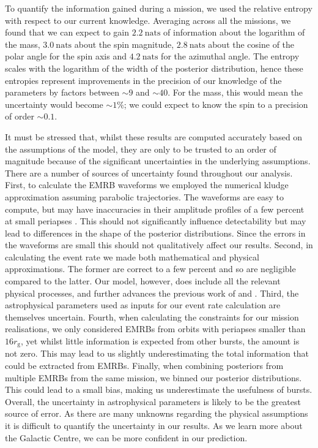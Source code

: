 \documentclass[useAMS,usedcolumn,usegraphicx,usenatbib]{mn2e}
\newcommand{\units}[1]{\ensuremath{~\mathrm{#1}}}
\newcommand{\sub}[1]{\ensuremath{_\mathrm{#1}}}
\begin{document}
To quantify the information gained during a mission, we used the relative entropy with respect to our current knowledge. Averaging across all the missions, we found that we can expect to gain $2.2\units{nats}$ of information about the logarithm of the mass, $3.0\units{nats}$ about the spin magnitude, $2.8\units{nats}$ about the cosine of the polar angle for the spin axis and $4.2\units{nats}$ for the azimuthal angle. The entropy scales with the logarithm of the width of the posterior distribution, hence these entropies represent improvements in the precision of our knowledge of the parameters by factors between $\sim9$ and $\sim40$. For the mass, this would mean the uncertainty would become $\sim1\%$; we could expect to know the spin to a precision of order $\sim0.1$.

It must be stressed that, whilst these results are computed accurately based on the assumptions of the model, they are only to be trusted to an order of magnitude because of the significant uncertainties in the underlying assumptions. There are a number of sources of uncertainty found throughout our analysis. First, to calculate the EMRB waveforms we employed the numerical kludge approximation assuming parabolic trajectories. The waveforms are easy to compute, but may have inaccuracies in their amplitude profiles of a few percent at small periapses \citep{Berry2013}. This should not significantly influence detectability but may lead to differences in the shape of the posterior distributions. Since the errors in the waveforms are small this should not qualitatively affect our results. Second, in calculating the event rate we made both mathematical and physical approximations. The former are correct to a few percent and so are negligible compared to the latter. Our model, however, does include all the relevant physical processes, and further advances the previous work of \citet{Rubbo2006} and \citet{Hopman2007}. Third, the astrophysical parameters used as inputs for our event rate calculation are themselves uncertain. Fourth, when calculating the constraints for our mission realisations, we only considered EMRBs from orbits with periapses smaller than $16 r\sub{g}$, yet whilst little information is expected from other bursts, the amount is not zero. This may lead to us slightly underestimating the total information that could be extracted from EMRBs. Finally, when combining posteriors from multiple EMRBs from the same mission, we binned our posterior distributions. This could lead to a small bias, making us underestimate the usefulness of bursts. Overall, the uncertainty in astrophysical parameters is likely to be the greatest source of error. As there are many unknowns regarding the physical assumptions it is difficult to quantify the uncertainty in our results. As we learn more about the Galactic Centre, we can be more confident in our prediction.
\end{document}
